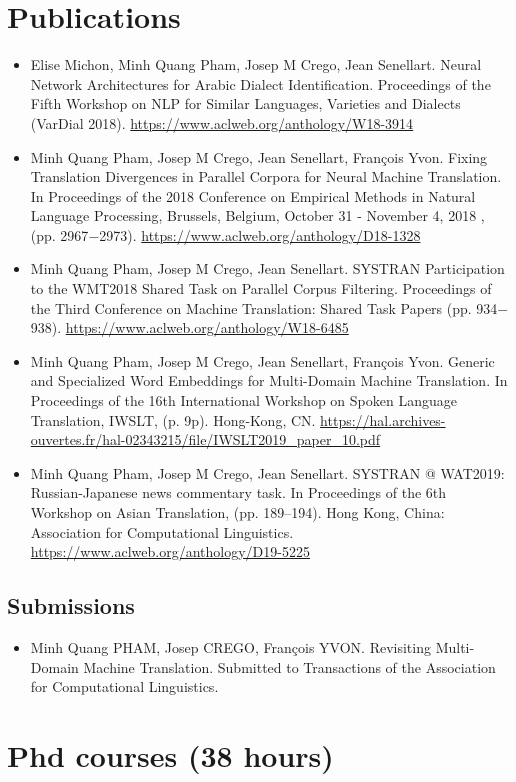 \documentclass[11pt, letterpaper]{article}
\begin{document}
\section*{Publications}
\begin{itemize}
	\item Elise Michon, Minh Quang Pham, Josep M Crego, Jean Senellart. Neural Network Architectures for Arabic Dialect Identification. Proceedings of the Fifth Workshop on NLP for Similar Languages, Varieties and Dialects (VarDial 2018). \url{https://www.aclweb.org/anthology/W18-3914}
	\item Minh Quang Pham, Josep M Crego, Jean Senellart, François Yvon. Fixing Translation Divergences in Parallel Corpora for Neural Machine Translation. In Proceedings of the 2018 Conference on Empirical Methods in Natural Language Processing, Brussels, Belgium, October 31 - November 4, 2018 , (pp. 2967$-$2973). \url{https://www.aclweb.org/anthology/D18-1328}
	\item Minh Quang Pham, Josep M Crego, Jean Senellart. SYSTRAN Participation to the WMT2018 Shared Task on Parallel Corpus Filtering. Proceedings of the Third Conference on Machine Translation: Shared Task Papers (pp. 934$-$938). \url{https://www.aclweb.org/anthology/W18-6485}
	\item Minh Quang Pham, Josep M Crego, Jean Senellart, François Yvon. Generic and Specialized Word Embeddings for Multi-Domain Machine Translation. In Proceedings of the 16th International Workshop on Spoken Language Translation, IWSLT, (p. 9p). Hong-Kong, CN. \url{https://hal.archives-ouvertes.fr/hal-02343215/file/IWSLT2019_paper_10.pdf}
	\item Minh Quang Pham, Josep M Crego, Jean Senellart. SYSTRAN @ WAT2019: Russian-Japanese news commentary task. In Proceedings of the 6th Workshop on Asian Translation, (pp. 189–194). Hong Kong, China: Association for Computational Linguistics. \url{https://www.aclweb.org/anthology/D19-5225}
\end{itemize}
\subsection*{Submissions}
\begin{itemize}
	\item Minh Quang PHAM, Josep CREGO, François YVON. Revisiting Multi-Domain Machine Translation. Submitted to Transactions of the Association for Computational Linguistics.
\end{itemize}
\section*{Phd courses (38 hours)}
\end{document}
